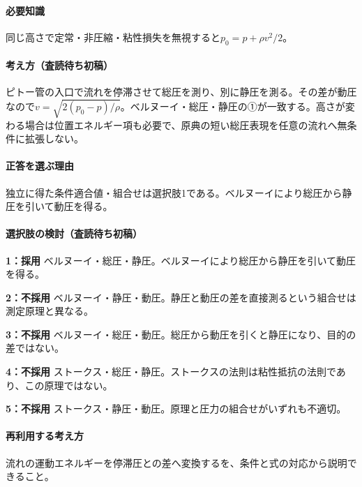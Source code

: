 \paragraph{必要知識} 同じ高さで定常・非圧縮・粘性損失を無視すると\(p_0=p+\rho v^2/2\)。

\paragraph{考え方（査読待ち初稿）} ピトー管の入口で流れを停滞させて総圧を測り、別に静圧を測る。その差が動圧なので\(v=\sqrt{2(p_0-p)/\rho}\)。ベルヌーイ・総圧・静圧の①が一致する。高さが変わる場合は位置エネルギー項も必要で、原典の短い総圧表現を任意の流れへ無条件に拡張しない。

\paragraph{正答を選ぶ理由} 独立に得た条件適合値・組合せは選択肢1である。ベルヌーイにより総圧から静圧を引いて動圧を得る。

\paragraph{選択肢の検討（査読待ち初稿）}\mbox{}\par

\noindent\textbf{1：採用} ベルヌーイ・総圧・静圧。ベルヌーイにより総圧から静圧を引いて動圧を得る。\par

\noindent\textbf{2：不採用} ベルヌーイ・静圧・動圧。静圧と動圧の差を直接測るという組合せは測定原理と異なる。\par

\noindent\textbf{3：不採用} ベルヌーイ・総圧・動圧。総圧から動圧を引くと静圧になり、目的の差ではない。\par

\noindent\textbf{4：不採用} ストークス・総圧・静圧。ストークスの法則は粘性抵抗の法則であり、この原理ではない。\par

\noindent\textbf{5：不採用} ストークス・静圧・動圧。原理と圧力の組合せがいずれも不適切。\par

\paragraph{再利用する考え方} 流れの運動エネルギーを停滞圧との差へ変換するを、条件と式の対応から説明できること。

